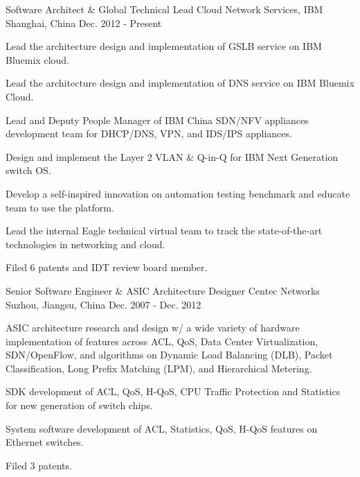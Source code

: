\begin{cventries}
  \cventry
    {Software Architect \& Global Technical Lead}
    {Cloud Network Services, IBM}
    {Shanghai, China}
    {Dec. 2012 - Present}
    {
      \begin{cvitems}
        \item {Lead the architecture design and implementation of GSLB service on IBM Bluemix cloud.}
        \item {Lead the architecture design and implementation of DNS service on IBM Bluemix Cloud.}
        \item {Lead and Deputy People Manager of IBM China SDN/NFV appliances development team for DHCP/DNS, VPN, and IDS/IPS appliances.}
        \item {Design and implement the Layer 2 VLAN \& Q-in-Q for IBM Next Generation switch OS.}
        \item {Develop a self-inspired innovation on automation testing benchmark and educate team to use the platform.}
        \item {Lead the internal Eagle technical virtual team to track the state-of-the-art technologies in networking and cloud.}
        \item {Filed 6 patents and IDT review board member.}
      \end{cvitems}
    }
  \cventry
    {Senior Software Engineer \& ASIC Architecture Designer}
    {Centec Networks}
    {Suzhou, Jiangsu, China}
    {Dec. 2007 - Dec. 2012}
    {
      \begin{cvitems}
        \item {ASIC architecture research and design w/ a wide variety of hardware implementation of features across ACL, QoS, Data Center Virtualization, SDN/OpenFlow, and algorithms on Dynamic Load Balancing (DLB), Packet Classification, Long Prefix Matching (LPM), and Hierarchical Metering.}
        \item {SDK development of ACL, QoS, H-QoS, CPU Traffic Protection and Statistics for new generation of switch chips.}
        \item {System software development of ACL, Statistics, QoS, H-QoS features on Ethernet switches.}
        \item {Filed 3 patents.}
      \end{cvitems}
    }
\end{cventries}
